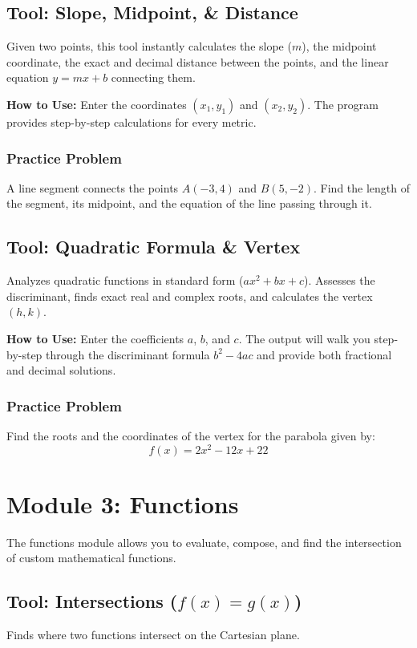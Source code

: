 \documentclass[11pt,a4paper]{article}
\begin{document}
\subsection{Tool: Slope, Midpoint, \& Distance}
Given two points, this tool instantly calculates the slope ($m$), the midpoint coordinate, the exact and decimal distance between the points, and the linear equation $y=mx+b$ connecting them.

\textbf{How to Use:} Enter the coordinates $(x_1, y_1)$ and $(x_2, y_2)$. The program provides step-by-step calculations for every metric.

\subsubsection*{Practice Problem}
A line segment connects the points $A(-3, 4)$ and $B(5, -2)$. Find the length of the segment, its midpoint, and the equation of the line passing through it.

\subsection{Tool: Quadratic Formula \& Vertex}
Analyzes quadratic functions in standard form ($ax^2 + bx + c$). Assesses the discriminant, finds exact real and complex roots, and calculates the vertex $(h, k)$.

\textbf{How to Use:} Enter the coefficients $a$, $b$, and $c$. The output will walk you step-by-step through the discriminant formula $b^2-4ac$ and provide both fractional and decimal solutions.

\subsubsection*{Practice Problem}
Find the roots and the coordinates of the vertex for the parabola given by:
\[ f(x) = 2x^2 - 12x + 22 \]


\newpage
\section{Module 3: Functions}
The functions module allows you to evaluate, compose, and find the intersection of custom mathematical functions.

\subsection{Tool: Intersections ($f(x) = g(x)$)}
Finds where two functions intersect on the Cartesian plane.
\end{document}
